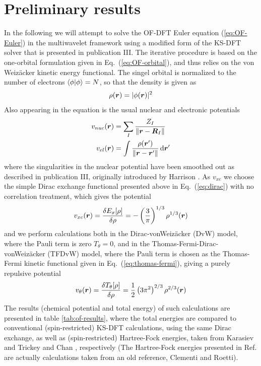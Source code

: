 \section{Preliminary results}
In the following we will attempt to solve the OF-DFT Euler equation (\ref{eq:OF-Euler}) in the multiwavelet 
framework using a modified form of the KS-DFT solver that is presented in publication III. The iterative
procedure is based on the one-orbital formulation given in Eq.~(\ref{eq:OF-orbital}), and thus relies on the
von Weiz\"{a}cker kinetic energy functional. The singel orbital is normalized to the number of electrons 
$\langle\phi|\phi\rangle = N$, so that the density is given as
\begin{equation}
    \rho(\boldsymbol r) = |\phi(\boldsymbol r)|^2
\end{equation}
Also appearing in the equation is the usual nuclear and electronic potentials
\begin{align}
    v_{nuc}(\boldsymbol r) &= \sum_{I} \frac{Z_I}{\|\boldsymbol r-\boldsymbol R_I\|} \\
    v_{el}(\boldsymbol r) &= \int \frac{\rho(\boldsymbol r')}{\|\boldsymbol r-\boldsymbol r'\|} \,\mathrm{d}\boldsymbol r'
\end{align}
where the singularities in the nuclear potential have been smoothed out as described in publication III, 
originally introduced by Harrison \etal\cite{Harrison:2004}. As $v_{xc}$ we choose the simple Dirac exchange
functional presented above in Eq.~(\ref{eq:dirac}) with no correlation treatment, which gives the potential
\begin{equation}
    v_{xc}(\boldsymbol r) = \frac{\delta E_x[\rho]}{\delta \rho} = -\left(\frac{3}{\pi}\right)^{1/3} \rho^{1/3}(\boldsymbol r)
\end{equation}
and we perform calculations both in the Dirac-vonWeiz\"{a}cker (DvW) model, where the Pauli term is zero 
$T_\theta = 0$, and in the Thomas-Fermi-Dirac-vonWeiz\"{a}cker (TFDvW) model, where the Pauli term is chosen as
the Thomas-Fermi kinetic functional given in Eq.~(\ref{eq:thomas-fermi}), giving a purely repulsive potential
\begin{equation}
    v_\theta(\boldsymbol r) = \frac{\delta T_\theta[\rho]}{\delta\rho} = \frac{1}{2}\left(3\pi^2\right)^{2/3} \rho^{2/3}(\boldsymbol r)
\end{equation}
The results (chemical potential and total energy) of such calculations are presented in table \ref{tab:of-results}, where
the total energies are compared to conventional (spin-restricted) KS-DFT calculations, using the same Dirac exchange,
as well as (spin-restricted) Hartree-Fock energies, taken from Karasiev and Trickey\cite{Karasiev:2012} and Chan 
\etal\cite{Chan:2000}, respectively (The Hartree-Fock energies presented in Ref.\cite{Chan:2000} are actually calculations 
taken from an old reference, Clementi and Roetti\cite{Clementi:1974}).

